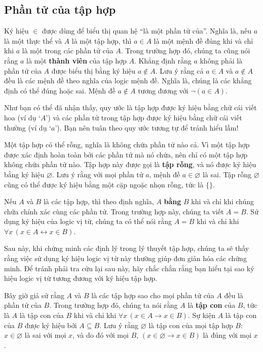 \subsection{Phần tử của tập hợp}

Ký hiệu $\in$ được dùng để biểu thị quan hệ ``là một phần tử của''. Nghĩa là, nếu $a$ là một thực thể và $A$ là một tập hợp, thì $a \in A$ là một mệnh đề đúng khi và chỉ khi $a$ là một trong các phần tử của $A$. Trong trường hợp đó, chúng ta cũng nói rằng $a$ là một \textbf{thành viên} của tập hợp $A$. Khẳng định rằng $a$ không phải là phần tử của $A$ được biểu thị bằng ký hiệu $a \notin A$. Lưu ý rằng cả $a \in A$ và $a \notin A$ đều là các mệnh đề theo nghĩa của logic mệnh đề. Nghĩa là, chúng là các khẳng định có thể đúng hoặc sai. Mệnh đề $a \notin A$ tương đương với $\neg(a \in A)$.

\begin{notebox}
Như bạn có thể đã nhận thấy, quy ước là tập hợp được ký hiệu bằng chữ cái viết hoa (ví dụ `$A$') và các phần tử trong tập hợp được ký hiệu bằng chữ cái viết thường (ví dụ `$a$'). Bạn nên tuân theo quy ước tương tự để tránh hiểu lầm!
\end{notebox}

Một tập hợp có thể rỗng, nghĩa là không chứa phần tử nào cả. Vì một tập hợp được xác định hoàn toàn bởi các phần tử mà nó chứa, nên chỉ có một tập hợp không chứa phần tử nào. Tập hợp này được gọi là \textbf{tập rỗng}, và nó được ký hiệu bằng ký hiệu $\varnothing$. Lưu ý rằng với mọi phần tử $a$, mệnh đề $a \in \varnothing$ là sai. Tập rỗng $\varnothing$ cũng có thể được ký hiệu bằng một cặp ngoặc nhọn rỗng, tức là $\{\}$.

Nếu $A$ và $B$ là các tập hợp, thì theo định nghĩa, $A$ \textbf{bằng} $B$ khi và chỉ khi chúng chứa chính xác cùng các phần tử. Trong trường hợp này, chúng ta viết $A = B$. Sử dụng ký hiệu của logic vị từ, chúng ta có thể nói rằng $A = B$ khi và chỉ khi $\forall x\,(x \in A \leftrightarrow x \in B)$.

\begin{warningbox}
Sau này, khi chứng minh các định lý trong lý thuyết tập hợp, chúng ta sẽ thấy rằng việc sử dụng ký hiệu logic vị từ này thường giúp đơn giản hóa các chứng minh. Để tránh phải tra cứu lại sau này, hãy chắc chắn rằng bạn hiểu tại sao ký hiệu logic vị từ tương đương với ký hiệu tập hợp.
\end{warningbox}

Bây giờ giả sử rằng $A$ và $B$ là các tập hợp sao cho mọi phần tử của $A$ đều là phần tử của $B$. Trong trường hợp đó, chúng ta nói rằng $A$ là \textbf{tập con} của $B$, tức là $A$ là tập con của $B$ khi và chỉ khi $\forall x\,(x \in A \to x \in B)$. Sự kiện $A$ là tập con của $B$ được ký hiệu bởi $A \subseteq B$. Lưu ý rằng $\varnothing$ là tập con của mọi tập hợp $B$: $x \in \varnothing$ là sai với mọi $x$, và do đó với mọi $B$, $(x \in \varnothing \to x \in B)$ là đúng với mọi $x$.

